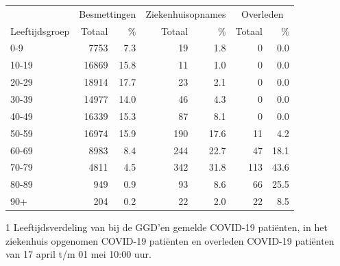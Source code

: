 \documentclass[
  english,
  man,floatsintext]{apa6}
\begin{document}
\begin{table}
\centering\begingroup\fontsize{11}{13}\selectfont

\begin{threeparttable}
\begin{tabular}{lrrrrrr}
\toprule
\multicolumn{1}{c}{ } & \multicolumn{2}{c}{Besmettingen} & \multicolumn{2}{c}{Ziekenhuisopnames} & \multicolumn{2}{c}{Overleden} \\
\cmidrule(l{3pt}r{3pt}){2-3} \cmidrule(l{3pt}r{3pt}){4-5} \cmidrule(l{3pt}r{3pt}){6-7}
Leeftijdsgroep & Totaal & \% & Totaal & \% & Totaal & \%\\
\midrule
0-9 & 7753 & 7.3 & 19 & 1.8 & 0 & 0.0\\
10-19 & 16869 & 15.8 & 11 & 1.0 & 0 & 0.0\\
20-29 & 18914 & 17.7 & 23 & 2.1 & 0 & 0.0\\
30-39 & 14977 & 14.0 & 46 & 4.3 & 0 & 0.0\\
40-49 & 16339 & 15.3 & 87 & 8.1 & 0 & 0.0\\
50-59 & 16974 & 15.9 & 190 & 17.6 & 11 & 4.2\\
60-69 & 8983 & 8.4 & 244 & 22.7 & 47 & 18.1\\
70-79 & 4811 & 4.5 & 342 & 31.8 & 113 & 43.6\\
80-89 & 949 & 0.9 & 93 & 8.6 & 66 & 25.5\\
90+ & 204 & 0.2 & 22 & 2.0 & 22 & 8.5\\
\bottomrule
\end{tabular}
\begin{tablenotes}
\item[1] Leeftijdsverdeling van bij de GGD’en gemelde COVID-19 patiënten, in het ziekenhuis opgenomen COVID-19 patiënten en overleden COVID-19 patiënten van 17 april t/m 01 mei 10:00 uur.
\end{tablenotes}
\end{threeparttable}
\endgroup{}
\end{table}

\newpage
\end{document}
